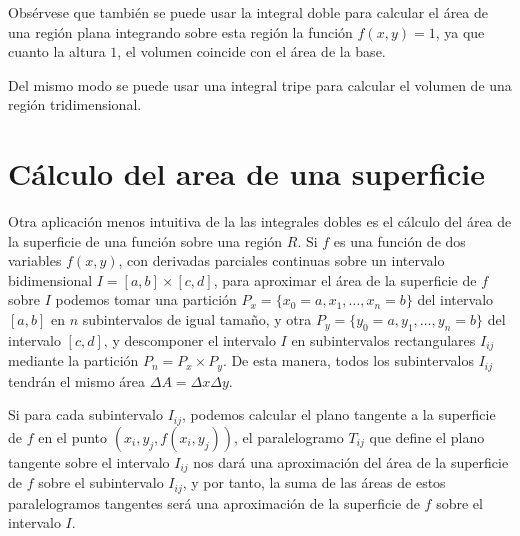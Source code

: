 \documentclass[
  a4paper,
]{scrreport}
\theoremstyle{plain}
\theoremstyle{definition}
\theoremstyle{plain}
\theoremstyle{plain}
\theoremstyle{definition}
\theoremstyle{definition}
\theoremstyle{remark}
\begin{document}
\begin{tcolorbox}[enhanced jigsaw, titlerule=0mm, arc=.35mm, colframe=quarto-callout-tip-color-frame, bottomrule=.15mm, opacitybacktitle=0.6, rightrule=.15mm, coltitle=black, colback=white, toprule=.15mm, title=\textcolor{quarto-callout-tip-color}{\faLightbulb}\hspace{0.5em}{Tip}, leftrule=.75mm, bottomtitle=1mm, opacityback=0, breakable, colbacktitle=quarto-callout-tip-color!10!white, toptitle=1mm, left=2mm]

Obsérvese que también se puede usar la integral doble para calcular el
área de una región plana integrando sobre esta región la función
\(f(x,y)=1\), ya que cuanto la altura \(1\), el volumen coincide con el
área de la base.

Del mismo modo se puede usar una integral tripe para calcular el volumen
de una región tridimensional.

\end{tcolorbox}

\section{Cálculo del area de una
superficie}\label{cuxe1lculo-del-area-de-una-superficie}

Otra aplicación menos intuitiva de la las integrales dobles es el
cálculo del área de la superficie de una función sobre una región \(R\).
Si \(f\) es una función de dos variables \(f(x,y)\), con derivadas
parciales continuas sobre un intervalo bidimensional
\(I=[a,b]\times[c,d]\), para aproximar el área de la superficie de \(f\)
sobre \(I\) podemos tomar una partición
\(P_x=\{x_0=a,x_1,\ldots, x_n=b\}\) del intervalo \([a,b]\) en \(n\)
subintervalos de igual tamaño, y otra
\(P_y=\{y_0=a,y_1,\ldots, y_n=b\}\) del intervalo \([c,d]\), y
descomponer el intervalo \(I\) en subintervalos rectangulares \(I_{ij}\)
mediante la partición \(P_n=P_x\times P_y\). De esta manera, todos los
subintervalos \(I_{ij}\) tendrán el mismo área
\(\Delta A = \Delta x\Delta y\).

Si para cada subintervalo \(I_{ij}\), podemos calcular el plano tangente
a la superficie de \(f\) en el punto \((x_i, y_j, f(x_i,y_j))\), el
paralelogramo \(T_{ij}\) que define el plano tangente sobre el intervalo
\(I_{ij}\) nos dará una aproximación del área de la superficie de \(f\)
sobre el subintervalo \(I_{ij}\), y por tanto, la suma de las áreas de
estos paralelogramos tangentes será una aproximación de la superficie de
\(f\) sobre el intervalo \(I\).
\end{document}

